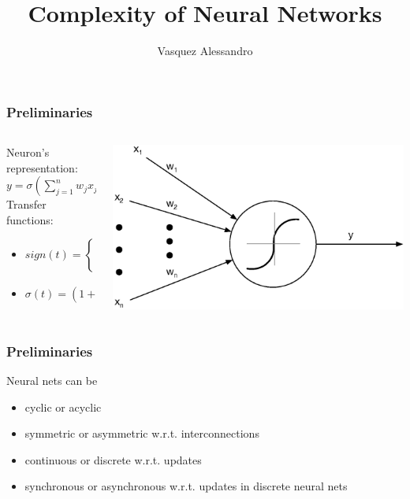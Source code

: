 \documentclass{beamer}
\title{Complexity of Neural Networks}
\author{Vasquez Alessandro}
\institute{Université Nice-Sophia-Antipolis}
\begin{document}
\frame{\titlepage}
\begin{frame}
\frametitle{Preliminaries}
\begin{columns}
	\begin{column}{0.47\textwidth}
		Neuron's representation:
		$y = \sigma (\sum_{j=1}^{n}w_jx_j - w_0)$ \\
		Transfer functions: 
		\begin{itemize}
			\item $   
			sign(t)  = 
			\begin{cases}
			0 &\quad\text{if } t \leq 0\\
			1 &\quad\text{if } t > 0 \\
			\end{cases}
			$
			\item $\sigma (t) = (1+e^{-t})^{-1}$
		\end{itemize}
	\end{column}
	\begin{column}{0.5\textwidth}
		\includegraphics[width=\textwidth]{images/neuron.eps}
	\end{column}
\end{columns}

\end{frame}


\begin{frame}
\frametitle{Preliminaries}
Neural nets can be
\begin{itemize}
	\item cyclic or acyclic
	\item symmetric or asymmetric w.r.t. interconnections
	\item continuous or discrete w.r.t. updates
	\item synchronous or asynchronous w.r.t. updates in discrete neural nets
\end{itemize}
\end{frame}
\end{document}
